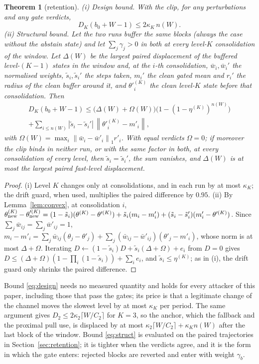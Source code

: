 \documentclass[journal]{IEEEtran}
\newtheorem{theorem}{Theorem}
\theoremstyle{remark}
\newcommand{\norm}[1]{\left\lVert #1 \right\rVert}
\begin{document}
\begin{theorem}[retention]\label{thm:retention}
(i) \emph{Design bound.} With the clip, for any perturbations and any gate verdicts,
\begin{equation}\label{eq:design}
D_K(b_0+W-1)\le 2\kappa_K\,n(W).
\end{equation}
(ii) \emph{Structural bound.} Let the two runs buffer the same blocks (always the case without the abstain state) and let $\sum_j\gamma_j>0$ in both at every level-$K$ consolidation of the window. Let $\Delta(W)$ be the largest paired displacement of the buffered
level-$(K{-}1)$ states in the window and, at the $i$-th consolidation, $\bar w_i,\bar w_i'$ the
normalised weights, $\tilde s_i,\tilde s_i'$ the steps taken, $m_i'$ the clean gated mean and $r_i'$
the radius of the clean buffer around it, and $\theta'^{(K)}_i$ the clean level-$K$ state before that consolidation. Then
\begin{multline}\label{eq:struct}
D_K(b_0+W-1)\le\big(\Delta(W)+\Omega(W)\big)\big(1-(1-\eta^{(K)})^{n(W)}\big)\\
+\sum_{i\le n(W)}|\tilde s_i-\tilde s_i'|\,\norm{\theta'^{(K)}_i-m'_i},
\end{multline}
with $\Omega(W)=\max_i\norm{\bar w_i-\bar w'_i}_1r'_i$. With equal verdicts $\Omega=0$; if moreover
the clip binds in neither run, or with the same factor in both, at every consolidation of every level,
then $\tilde s_i=\tilde s_i'$, the sum vanishes, and $\Delta(W)$ is at most the largest paired
fast-level displacement.
\end{theorem}
\begin{proof}
(i) Level $K$ changes only at consolidations, and in each run by at most $\kappa_K$; the drift guard,
when used, multiplies the paired difference by $0.95$. (ii) By Lemma~\ref{lem:convex}, at consolidation $i$,
$\theta^{(K)}_{\rm new}-\theta'^{(K)}_{\rm new}=(1-\tilde s_i)(\theta^{(K)}-\theta'^{(K)})+\tilde s_i(m_i-m'_i)+(\tilde s_i-\tilde s'_i)(m'_i-\theta'^{(K)})$.
Since $\sum_j\bar w_{ij}=\sum_j\bar w'_{ij}=1$, $m_i-m'_i=\sum_j\bar w_{ij}(\theta_j-\theta'_j)+\sum_j(\bar w_{ij}-\bar w'_{ij})(\theta'_j-m'_i)$,
whose norm is at most $\Delta+\Omega$. Iterating $D\leftarrow(1-\tilde s_i)D+\tilde s_i(\Delta+\Omega)+e_i$ from
$D=0$ gives $D\le(\Delta+\Omega)(1-\prod_i(1-\tilde s_i))+\sum_ie_i$, and $\tilde s_i\le\eta^{(K)}$; as in (i), the drift guard only shrinks the paired difference.
\end{proof}
Bound \eqref{eq:design} needs no measured quantity and holds for every attacker of this paper,
including those that pass the gates; its price is that a legitimate change of the channel moves the
slowest level by at most $\kappa_K$ per period. The same argument gives $D_2\le2\kappa_2\lceil W/C_2\rceil$ for $K=3$, so the anchor, which the fallback and the proximal pull use, is displaced by at most $\kappa_2\lceil W/C_2\rceil+\kappa_K n(W)$ after the last block of the window. Bound \eqref{eq:struct} is evaluated on the paired
trajectories in Section~\ref{sec:retention}; it is tighter when the verdicts agree, and it is the
form in which the gate enters: rejected blocks are reverted and enter with weight $\gamma_b$.
\end{document}
